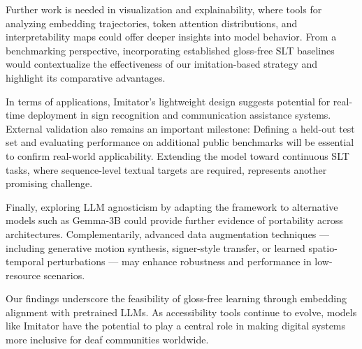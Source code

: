 \documentclass[runningheads]{llncs}
\begin{document}
Further work is needed in visualization and explainability, where tools for analyzing embedding trajectories, token attention distributions, and interpretability maps could offer deeper insights into model behavior. From a benchmarking perspective, incorporating established gloss-free SLT baselines would contextualize the effectiveness of our imitation-based strategy and highlight its comparative advantages.

In terms of applications, Imitator’s lightweight design suggests potential for real-time deployment in sign recognition and communication assistance systems. External validation also remains an important milestone: Defining a held-out test set and evaluating performance on additional public benchmarks will be essential to confirm real-world applicability. Extending the model toward continuous SLT tasks, where sequence-level textual targets are required, represents another promising challenge.

Finally, exploring LLM agnosticism by adapting the framework to alternative models such as Gemma-3B could provide further evidence of portability across architectures. Complementarily, advanced data augmentation techniques — including generative motion synthesis, signer-style transfer, or learned spatio-temporal perturbations — may enhance robustness and performance in low-resource scenarios.

Our findings underscore the feasibility of gloss-free learning through embedding alignment with pretrained LLMs. As accessibility tools continue to evolve, models like Imitator have the potential to play a central role in making digital systems more inclusive for deaf communities worldwide.




\end{document}
